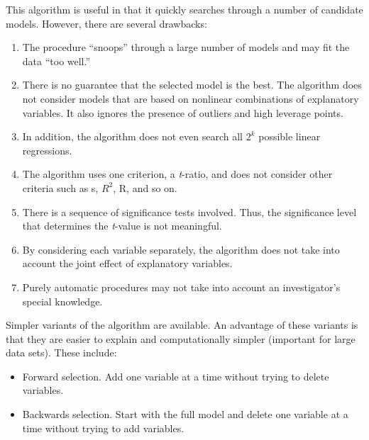 This algorithm is useful in that it quickly searches through a number of
candidate models. However, there are several drawbacks:
\begin{enumerate}

\item The procedure ``snoops'' through a large number of models and may
fit the data ``too well.''

\item There is no guarantee that the selected model is the best. The algorithm
does not consider models that are based on nonlinear combinations of
explanatory variables. It also ignores the presence of outliers and
high leverage points. 

  \item In addition, the algorithm does not even search all $2^{k}$ possible
linear regressions.

  \item The algorithm uses one criterion, a \textit{t}-ratio, and does not
consider other criteria such as s, $R^2$, R, and so on.

  \item There is a sequence of significance tests involved. Thus, the
significance level that determines the \textit{t}-value is not
meaningful.

  \item By considering each variable separately, the algorithm does not take into
account the joint effect of explanatory variables.

  \item Purely automatic procedures may not take into account an investigator's
special knowledge.

\end{enumerate}

Simpler variants of the algorithm are available. An advantage of
these variants is that they are easier to explain and
computationally simpler (important for large data sets). These
include:

\begin{itemize}
\item Forward selection. Add one variable at a time without trying
to delete variables.

\item Backwards selection. Start with the full model and delete one variable at
a time without trying to add variables.

\end{itemize}

